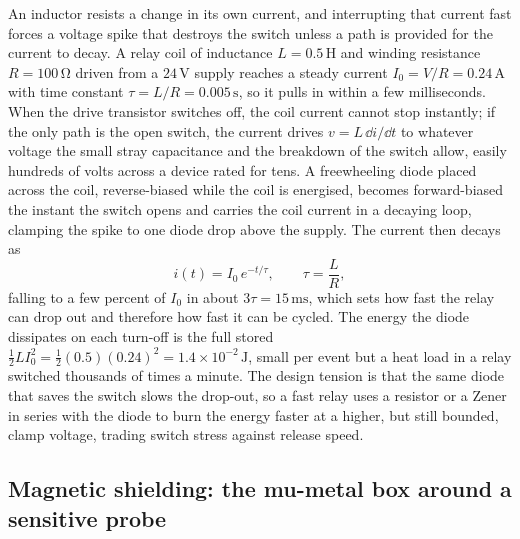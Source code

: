 An inductor resists a change in its own current, and interrupting that
current fast forces a voltage spike that destroys the switch unless a path
is provided for the current to decay. A relay coil of inductance $L =
0.5\,\si{\henry}$ and winding resistance $R = 100\,\si{\ohm}$ driven from a
$24\,\si{\volt}$ supply reaches a steady current $I_0 = V/R = 0.24\,\si{
\ampere}$ with time constant $\tau = L/R = 0.005\,\si{\second}$, so it pulls
in within a few milliseconds. When the drive transistor switches off, the
coil current cannot stop instantly; if the only path is the open switch,
the current drives $v = L\,\dd i/\dd t$ to whatever voltage the small stray
capacitance and the breakdown of the switch allow, easily hundreds of volts
across a device rated for tens. A freewheeling diode placed across the coil,
reverse-biased while the coil is energised, becomes forward-biased the
instant the switch opens and carries the coil current in a decaying loop,
clamping the spike to one diode drop above the supply. The current then
decays as
\[
i(t) = I_0\,e^{-t/\tau}, \qquad \tau = \frac{L}{R},
\]
falling to a few percent of $I_0$ in about $3\tau = 15\,\si{\milli\second}$,
which sets how fast the relay can drop out and therefore how fast it can be
cycled. The energy the diode dissipates on each turn-off is the full stored
$\tfrac12 L I_0^{2} = \tfrac12(0.5)(0.24)^{2} = 1.4\times 10^{-2}\,\si{
\joule}$, small per event but a heat load in a relay switched thousands of
times a minute. The design tension is that the same diode that saves the
switch slows the drop-out, so a fast relay uses a resistor or a Zener in
series with the diode to burn the energy faster at a higher, but still
bounded, clamp voltage, trading switch stress against release speed.

\subsection{Magnetic shielding: the mu-metal box around a sensitive probe}

